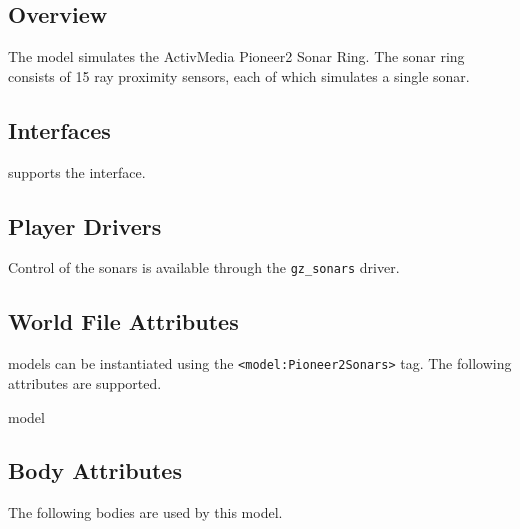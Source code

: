 
\subsection{Overview}

The {\tt \modelName} model simulates the ActivMedia Pioneer2 Sonar Ring. The sonar ring consists of 15 ray proximity sensors, each of which simulates a single sonar.

\subsection{\libgazebo Interfaces}

{\tt \modelName} supports the  interface.


\subsection{Player Drivers}

Control of the sonars  is available through the
{\tt gz\_sonars} driver.


\subsection{World File Attributes}

{\tt \modelName} models can be instantiated using the
\verb+<model:Pioneer2Sonars>+ tag.  The following attributes are
supported.

\begin{xmlattrtable}{model}{\modelName}

\end{xmlattrtable}


\subsection{Body Attributes}

The following bodies are used by this model.

\begin{bodyattrtable}
\bodydefaults
\end{bodyattrtable}

